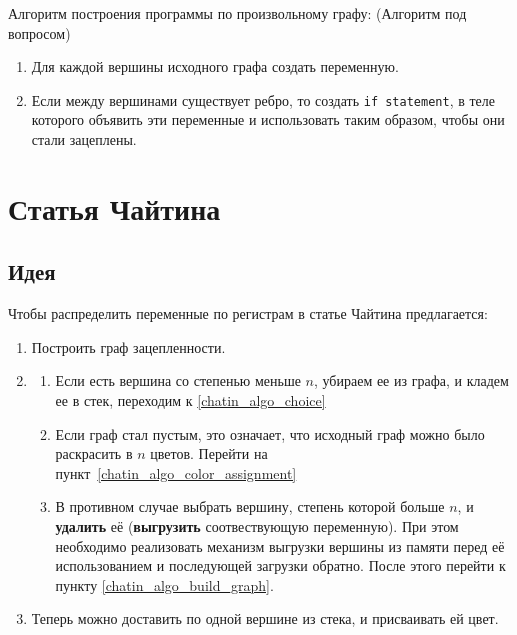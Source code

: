 Алгоритм построения программы по произвольному графу: (Алгоритм под вопросом)

\begin{enumerate} %
    \item Для каждой вершины исходного графа создать переменную.
    \item Если между вершинами существует ребро, то создать \texttt{if statement}, в теле
    которого объявить эти переменные и использовать таким образом, чтобы они стали зацеплены.
\end{enumerate}


\section{Статья Чайтина}

\subsection{Идея}

Чтобы распределить переменные по регистрам в статье Чайтина предлагается:

\begin{enumerate}
    \item Построить граф зацепленности.\label{chatin_algo_build_graph}
    \item \label{chatin_algo_choice}\begin{enumerate}
        \item Если есть вершина со степенью меньше $n$, убираем ее из графа, и кладем ее в стек, переходим
        к \ref{chatin_algo_choice}
        \item Если граф стал пустым, это означает, что исходный граф можно было раскрасить в $n$ цветов.
        Перейти на пункт~\ref{chatin_algo_color_assignment}
        \item В противном случае выбрать вершину, степень которой больше $n$, и \textbf{удалить} её (\textbf{выгрузить} соотвествующую переменную).
        При этом необходимо реализовать механизм выгрузки вершины из памяти перед её использованием и
        последующей загрузки обратно. После этого перейти к пункту \ref{chatin_algo_build_graph}.
        \label{chatin_algo_spill}
    \end{enumerate}

    \item Теперь можно доставить по одной вершине из стека, и присваивать ей цвет. \label{chatin_algo_color_assignment}
\end{enumerate}

